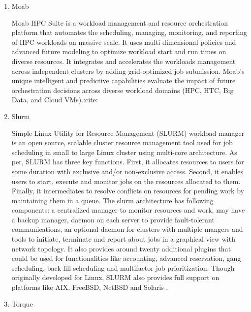 \begin{enumerate}
\item {} 
Moab

Moab HPC Suite is a workload management and resource orchestration
platform that automates the scheduling, managing, monitoring, and
reporting of HPC workloads on massive scale. It uses multi-dimensional
policies and advanced future modeling to optimize workload start and
run times on diverse resources. It integrates and accelerates the
workloads management across independent clusters by adding
grid-optimized job submission. Moab's unique intelligent and
predictive capabilities evaluate the impact of future orchestration
decisions across diverse workload domains (HPC, HTC, Big Data, and
Cloud VMs).:cite:

\item {} 
Slurm \label{\detokenize{i524/technologies:id523}}{\hyperref[\detokenize{i524/technologies:www-slurm}]{\sphinxcrossref{{[}449{]}}}}

Simple Linux Utility for Resource Management (SLURM) workload
manager is an open source, scalable cluster resource management
tool used for job scheduling in small to large Linux cluster
using multi-core architecture. As per,
\label{\detokenize{i524/technologies:id524}}{\hyperref[\detokenize{i524/technologies:www-slurmschedmdsite}]{\sphinxcrossref{{[}450{]}}}} SLURM has three key
functions. First, it allocates resources to users for some
duration with exclusive and/or non-exclusive access. Second, it
enables users to start, execute and monitor jobs on the resources
allocated to them. Finally, it intermediates to resolve conflicts
on resources for pending work by maintaining them in a queue. The
slurm architecture has following components: a centralized
manager to monitor resources and work, may have a backup manager,
daemon on each server to provide fault-tolerant communications,
an optional daemon for clusters with multiple mangers and tools
to initiate, terminate and report about jobs in a graphical view
with network topology. It also provides around twenty additional
plugins that could be used for functionalities like accounting,
advanced reservation, gang scheduling, back fill scheduling and
multifactor job prioritization. Though originally developed for
Linux, SLURM also provides full support on platforms like AIX,
FreeBSD, NetBSD and Solaris \label{\detokenize{i524/technologies:id525}}{\hyperref[\detokenize{i524/technologies:www-slurmplatformssite}]{\sphinxcrossref{{[}451{]}}}}.

\item {} 
Torque


\end{enumerate}
